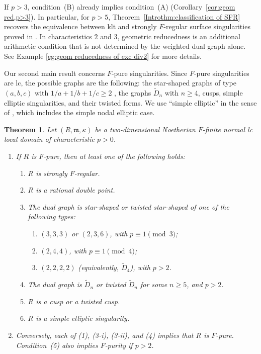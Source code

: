 \documentclass[12pt]{amsart}
\def\ge{\geqslant}
\def\tilde{\widetilde}
\def\m{{\mathfrak m}}
\theoremstyle{plain}
\theoremstyle{definition}
\theoremstyle{remark}
\newtheorem{defn and notation}[thm]{Definition and Notation}
\theoremstyle{plain}
\newtheorem{theo}{Theorem}
\numberwithin{equation}{thm}
\begin{document}
If $p>3$, condition~(B) already implies condition~(A) (Corollary~\ref{cor:geom red,p>3}). In particular, for $p>5$, Theorem~\ref{Introthm:classification of SFR} recovers the equivalence between klt and strongly $F$-regular surface singularities proved in \cite{Sato-Takagi(generalhyperplane)}. In characteristics $2$ and $3$, geometric reducedness is an additional arithmetic condition that is not determined by the weighted dual graph alone.
See Example \ref{eg:geom reducedness of exc div2} for more details.

Our second main result concerns $F$-pure singularities. 
Since $F$-pure singularities are lc, the possible graphs are the following:
the star-shaped graphs of type $(a,b,c)$ with $1/a+1/b+1/c \ge 2$ , the graphs $\tilde D_n$ with $n \ge 4$, cusps, simple elliptic singularities, and their twisted forms.
We use ``simple elliptic'' in the sense of \cite[Definition 4.12]{Sato23}, which includes the simple nodal elliptic case.

\begin{theo}\label{Introthm:classification of SFP}
Let $(R,\m,\kappa)$ be a two-dimensional Noetherian $F$-finite normal lc local domain of characteristic $p>0$.
\begin{enumerate}
\item[\textup{(I)}] If $R$ is $F$-pure, then at least one of the following holds:
\begin{enumerate}[label=\textup{(\arabic*)}]
\item $R$ is strongly $F$-regular.
\item $R$ is a rational double point.
\item The dual graph is star-shaped or twisted star-shaped of one of the following types:
\begin{enumerate}[label=\textup{(\roman*)}]
\item $(3,3,3)$ or $(2,3,6)$, with $p\equiv1\pmod3$;
\item $(2,4,4)$, with $p\equiv1\pmod4$;
\item $(2,2,2,2)$ (equivalently, $\tilde D_4$), with $p>2$.
\end{enumerate}
\item The dual graph is $\tilde D_n$ or twisted $\tilde D_n$ for some $n\geq5$, and $p>2$.
\item $R$ is a cusp or a twisted cusp.
\item $R$ is a simple elliptic singularity.
\end{enumerate}
\item[\textup{(II)}] Conversely, each of \textup{(1)}, \textup{(3-i)}, \textup{(3-ii)}, and \textup{(4)} implies that $R$ is $F$-pure. Condition~\textup{(5)} also implies $F$-purity if $p>2$.
\end{enumerate}
\end{theo}
\end{document}
